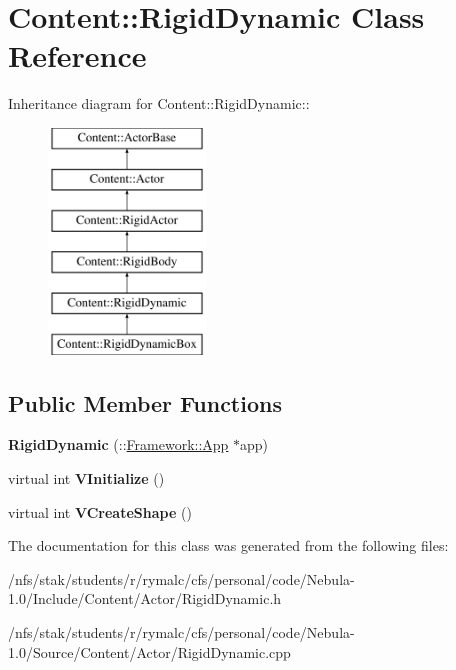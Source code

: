 \hypertarget{classContent_1_1RigidDynamic}{
\section{Content::RigidDynamic Class Reference}
\label{classContent_1_1RigidDynamic}
}
Inheritance diagram for Content::RigidDynamic::\begin{figure}[H]
\begin{center}
\leavevmode
\includegraphics[height=6cm]{classContent_1_1RigidDynamic}
\end{center}
\end{figure}
\subsection*{Public Member Functions}
\begin{DoxyCompactItemize}
\item 
\hypertarget{classContent_1_1RigidDynamic_a49fb3986a02165974e361eaf0beba83b}{
{\bfseries RigidDynamic} (::\hyperlink{classFramework_1_1App}{Framework::App} $\ast$app)}
\label{classContent_1_1RigidDynamic_a49fb3986a02165974e361eaf0beba83b}

\item 
\hypertarget{classContent_1_1RigidDynamic_a1cadf84d5174fbf7f29baf3d992bb8a4}{
virtual int {\bfseries VInitialize} ()}
\label{classContent_1_1RigidDynamic_a1cadf84d5174fbf7f29baf3d992bb8a4}

\item 
\hypertarget{classContent_1_1RigidDynamic_a1ffd2a90d13e691da68e917a447623d7}{
virtual int {\bfseries VCreateShape} ()}
\label{classContent_1_1RigidDynamic_a1ffd2a90d13e691da68e917a447623d7}

\end{DoxyCompactItemize}


The documentation for this class was generated from the following files:\begin{DoxyCompactItemize}
\item 
/nfs/stak/students/r/rymalc/cfs/personal/code/Nebula-\/1.0/Include/Content/Actor/RigidDynamic.h\item 
/nfs/stak/students/r/rymalc/cfs/personal/code/Nebula-\/1.0/Source/Content/Actor/RigidDynamic.cpp\end{DoxyCompactItemize}
